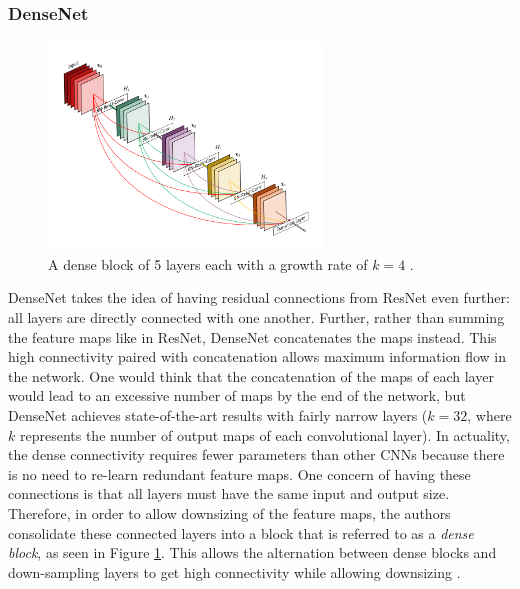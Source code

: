 \subsubsection{DenseNet}
\begin{figure}
    \centering
    \includegraphics[width=0.65\textwidth]{images/denseblock.png}
    \caption{A dense block of 5 layers each with a growth rate of $k = 4$ \cite{densenet}.}
    \label{denseblock}
\end{figure}
DenseNet takes the idea of having residual connections from ResNet even further: all layers are directly connected with one another. Further, rather than summing the feature maps like in ResNet, DenseNet concatenates the maps instead. This high connectivity paired with concatenation allows maximum information flow in the network. One would think that the concatenation of the maps of each layer would lead to an excessive number of maps by the end of the network, but DenseNet achieves state-of-the-art results with fairly narrow layers ($k = 32$, where $k$ represents the number of output maps of each convolutional layer). In actuality, the dense connectivity requires fewer parameters than other CNNs because there is no need to re-learn redundant feature maps. One concern of having these connections is that all layers must have the same input and output size. Therefore, in order to allow downsizing of the feature maps, the authors consolidate these connected layers into a block that is referred to as a \emph{dense block}, as seen in Figure \ref{denseblock}. This allows the alternation between dense blocks and down-sampling layers to get high connectivity while allowing downsizing \cite{densenet}.


